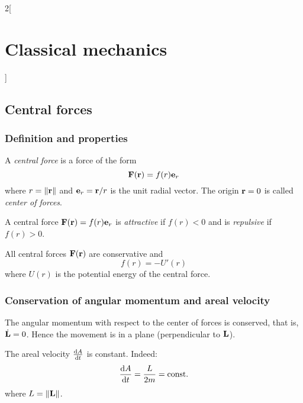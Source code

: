 \documentclass[../../../main.tex]{subfiles}
\begin{document}
\begin{multicols}{2}[\section{Classical mechanics}]
  \subsection{Central forces}
  \subsubsection{Definition and properties}
  \begin{definition}
    A \emph{central force} is a force of the form
    \begin{equation}\label{CM_central-force}
      \boldsymbol{\mathrm{F}}(\boldsymbol{\mathrm{r}})=f(r)\boldsymbol{\mathrm{e}}_r
    \end{equation} where $r=\|\boldsymbol{\mathrm{r}}\|$ and $\boldsymbol{\mathrm{e}}_r=\boldsymbol{\mathrm{r}}/r$ is the unit radial vector. The origin $\boldsymbol{\mathrm{r}}=0$ is called \emph{center of forces}.
  \end{definition}
  \begin{definition}
    A central force $\boldsymbol{\mathrm{F}}(\boldsymbol{\mathrm{r}})=f(r)\boldsymbol{\mathrm{e}}_r$ is \emph{attractive} if $f(r)<0$ and is \emph{repulsive} if $f(r)>0$.
  \end{definition}
  \begin{proposition}
    All central forces $\boldsymbol{\mathrm{F}}(\boldsymbol{\mathrm{r}})$ are conservative and $$f(r)=-U'(r)$$ where $U(r)$ is the potential energy of the central force.
  \end{proposition}
  \subsubsection{Conservation of angular momentum and areal velocity}
  \begin{proposition}
    The angular momentum with respect to the center of forces is conserved, that is, $\dot{\boldsymbol{\mathrm{L}}}=0$. Hence the movement is in a plane (perpendicular to $\boldsymbol{\mathrm{L}}$).
  \end{proposition}
  \begin{proposition}
    The areal velocity $\dv{A}{t}$ is constant. Indeed: $$\dv{A}{t}=\frac{L}{2m}=\text{const.}$$ where $L=\|\boldsymbol{\mathrm{L}}\|$.
  \end{proposition}

\end{multicols}
\end{document}
